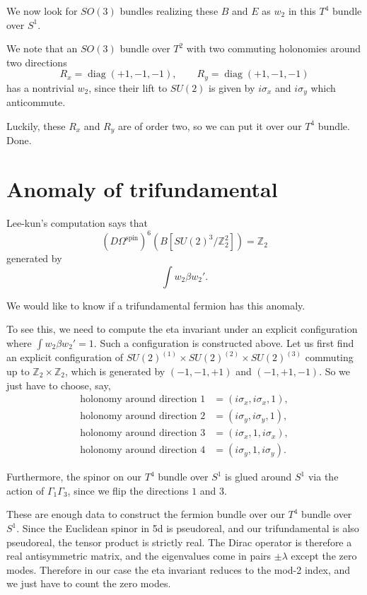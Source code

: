 \documentclass[12pt]{article}
\numberwithin{equation}{section}
\def\bZ{\mathbb{Z}}
\def\diag{\mathop{\mathrm{diag}}}
\begin{document}
We now look for $SO(3)$ bundles realizing these $B$ and $E$ as $w_2$ in this $T^4$ bundle over $S^1$.

We note that an $SO(3)$ bundle over $T^2$ with two commuting holonomies around two directions \[
R_x = \diag(+1,-1,-1),\qquad
R_y = \diag(+1,-1,-1)
\] has a nontrivial $w_2$, since their lift to $SU(2)$ is given by $i\sigma_x$ and $i\sigma_y$ which anticommute.

Luckily, these $R_x$ and $R_y$ are of order two, so we can put it over our $T^4$ bundle. Done.

\section{Anomaly of trifundamental}

Lee-kun's computation says that \[
(D\Omega^\text{spin})^6 (B[SU(2)^3/\bZ_2^2]) = \bZ_2 
\] generated by \[
\int w_2 \beta w_2'.
\]

We would like to know if a trifundamental fermion has this anomaly.

To see this, we need to compute the eta invariant under an explicit configuration where $\int w_2 \beta w_2'=1$. 
Such a configuration is constructed above. 
Let us first find an explicit configuration of $SU(2)^{(1)}\times SU(2)^{(2)} \times SU(2)^{(3)}$ commuting up to $\bZ_2\times \bZ_2$, which is generated by $(-1,-1,+1)$ and $(-1,+1,-1)$.
So we just have to choose, say, \begin{align}
\text{holonomy around direction 1} &= (i\sigma_x, i\sigma_x, 1), \\
\text{holonomy around direction 2} &= (i\sigma_y, i\sigma_y, 1), \\
\text{holonomy around direction 3} &= (i\sigma_x, 1,i\sigma_x), \\
\text{holonomy around direction 4} &= (i\sigma_y, 1,i\sigma_y).
\end{align}

Furthermore, the spinor on our $T^4$ bundle over $S^1$ is glued around $S^1$ via the action of $\Gamma_1\Gamma_3$, 
since we flip the directions $1$ and $3$.

These are enough data to construct the fermion bundle over our $T^4$ bundle over $S^1$. 
Since the Euclidean spinor in 5d is pseudoreal, and our trifundamental is also pseudoreal,
the tensor product is strictly real.
The Dirac operator is therefore a real antisymmetric matrix, and the eigenvalues come in pairs $\pm \lambda$
except the zero modes.
Therefore in our case the eta invariant reduces to the mod-2 index,
and we just have to count the zero modes.
\fi
\end{document}
